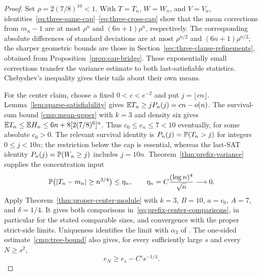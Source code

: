 \begin{proof}
Set \(\rho=2(7/8)^{10}<1\).  With \(T=T_n\), \(W=W_n\), and
\(V=V_n\), identities~\eqref{eq:three-same-cap}--\eqref{eq:three-cross-cap}
show that the mean corrections from \(m_n-1\) are at most \(\rho^n\)
and \((6n+1)\rho^n\), respectively.  The corresponding absolute differences
of standard deviations are at most \(\rho^{n/2}\) and
\((6n+1)\rho^{n/2}\); the sharper geometric bounds are those in
Section~\ref{sec:three-clause-refinements}, obtained from
Proposition~\ref{prop:cap-bridge}.  These exponentially small corrections
transfer the variance estimate to both last-satisfiable statistics.
Chebyshev's inequality gives their tails about their own means.

For the center claim, choose a fixed \(0<c<e^{-2}\) and put
\(j=\lfloor cn\rfloor\).  Lemma~\ref{lem:sparse-satisfiability} gives
\(\mathbb E T_n\ge jP_n(j)=cn-o(n)\).  The survival-sum bound
\eqref{cmp:mean-upper} with \(k=3\) and density six gives
\(\mathbb E T_n\le\mathbb E H_n\le6n+8[2(7/8)^6]^n\).
Thus \(c_0\le e_n\le7<10\) eventually, for some absolute \(c_0>0\).
The relevant survival identity is
\(P_n(j)=\mathbb P(T_n>j)\) for integers \(0\le j<10n\);
the restriction below the cap is essential, whereas the last-SAT identity
\(P_n(j)=\mathbb P(W_n\ge j)\) includes \(j=10n\).
Theorem~\ref{thm:prefix-variance} supplies the concentration input
\begin{equation}\label{eq:prefix-center-concentration}
 \mathbb P\bigl(|T_n-m_n|\ge n^{3/4}\bigr)\le\eta_n,
 \qquad \eta_n=C\frac{(\log n)^4}{\sqrt n}\longrightarrow0.
\end{equation}
Apply Theorem~\ref{thm:proper-center-module} with \(k=3\), \(B=10\),
\(a=c_0\), \(A=7\), and \(\delta=1/4\).  It gives both comparisons
in~\eqref{eq:prefix-center-comparisons}, in particular for the stated
comparable sizes, and convergence with the proper strict-side limits.
Uniqueness identifies the limit with \(\alpha_3\) of
\cite[Theorem~\ThresholdTheorem]{FixedKThreshold}.  The one-sided
estimate~\eqref{cmp:tree-bound} also gives, for every sufficiently large
\(s\) and every \(N\ge s^2\),
\[
 e_N\ge e_s-C's^{-1/4}.
\]
\end{proof}

